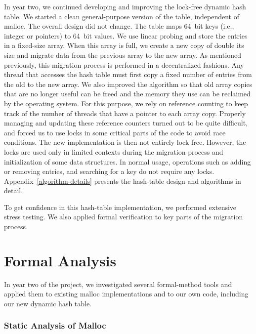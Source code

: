 \documentclass[12pt]{cslreport}
\begin{document}
In year two, we continued developing and improving the lock-free
dynamic hash table. We started a clean general-purpose version of the
table, independent of malloc. The overall design did not change. The
table maps 64~bit keys (i.e., integer or pointers) to 64~bit values.
We use linear probing and store the entries in a fixed-size
array. When this array is full, we create a new copy of double its
size and migrate data from the previous array to the new array. As
mentioned previously, this migration process is performed in a
decentralized fashions. Any thread that accesses the hash table must
first copy a fixed number of entries from the old to the new array.
We also improved the algorithm so that old array copies that are no
longer useful can be freed and the memory they use can be reclaimed by
the operating system. For this purpose, we rely on reference counting
to keep track of the number of threads that have a pointer to each
array copy. Properly managing and updating these reference counters
turned out to be quite difficult, and forced us to use locks in some
critical parts of the code to avoid race conditions. The new
implementation is then not entirely lock free. However, the locks are
used only in limited contexts during the migration process and
initialization of some data structures. In normal usage, operations
such as adding or removing entries, and searching for a key do not
require any locks. Appendix~\ref{algorithm-details} presents the
hash-table design and algorithms in detail.

To get confidence in this hash-table implementation, we performed
extensive stress testing. We also applied formal verification to key
parts of the migration process.


\section{Formal Analysis}
\label{verification}

In year two of the project, we investigated several formal-method
tools and applied them to existing malloc implementations and to our
own code, including our new dynamic hash table.

\subsubsection{Static Analysis of Malloc}
\end{document}
